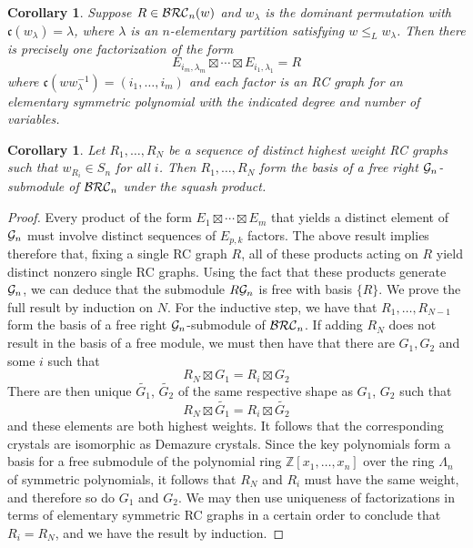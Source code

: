 \documentclass{amsart}
\newtheorem{corollary}[lemma]{Corollary}
\theoremstyle{definition}
\theoremstyle{remark}
\numberwithin{equation}{subsection}
\newcommand{\wof}[1]{w_{#1}}
\newcommand{\code}{\mathfrak{c}}
\begin{document}
\begin{corollary}
Suppose $R\in \mathcal{BRC}_n(w)$ and $w_{\lambda}$ is the dominant permutation with $\code(w_\lambda) = \lambda$, where $\lambda$ is an $n$-elementary partition satisfying $w\leq_L w_{\lambda}$. Then there is precisely one factorization of the form
$$E_{i_m, \lambda_m}\boxtimes\cdots \boxtimes E_{i_1, \lambda_1} = R$$
where $\code(ww_{\lambda}^{-1}) = (i_1,\ldots,i_m)$ and each factor is an RC graph for an elementary symmetric polynomial with the indicated degree and number of variables.
\end{corollary}

\begin{corollary}
  Let $R_1, \ldots, R_N$ be a sequence of distinct highest weight RC graphs such that $\wof{R_i}\in S_n$ for all $i$. Then $R_1,\ldots,R_N$ form the basis of a free right $\mathcal{G}_n$-submodule of $\mathcal{BRC}_n$ under the squash product.
\end{corollary}
\begin{proof}
Every product of the form $E_1\boxtimes \cdots\boxtimes E_m$ that yields a distinct element of $\mathcal{G}_n$ must involve distinct sequences of $E_{p,k}$ factors. The above result implies therefore that, fixing a single RC graph $R$, all of these products acting on $R$ yield distinct nonzero single RC graphs. Using the fact that these products generate $\mathcal{G}_n$, we can deduce that the submodule $R\mathcal{G}_n$ is free with basis $\{R\}$. We prove the full result by induction on $N$. For the inductive step, we have that $R_1,\ldots,R_{N-1}$ form the basis of a free right $\mathcal{G}_n$-submodule of $\mathcal{BRC}_n$. If adding $R_N$ does not result in the basis of a free module, we must then have that there are $G_1, G_2$ and some $i$ such that
$$R_N\boxtimes G_1 = R_i\boxtimes G_2$$
There are then unique $\widetilde{G_1}$, $\widetilde{G_2}$ of the same respective shape as $G_1$, $G_2$ such that 
$$R_N\boxtimes \widetilde{G_1}=R_i\boxtimes \widetilde{G_2}$$
and these elements are both highest weights. It follows that the corresponding crystals are isomorphic as Demazure crystals. Since the key polynomials form a basis for a free submodule of the polynomial ring $\mathbb{Z}[x_1,\ldots,x_n]$ over the ring $\Lambda_n$ of symmetric polynomials, it follows that $R_N$ and $R_i$ must have the same weight, and therefore so do $G_1$ and $G_2$. We may then use uniqueness of factorizations in terms of elementary symmetric RC graphs in a certain order to conclude that $R_i=R_N$, and we have the result by induction.
\end{proof}
\end{document}
